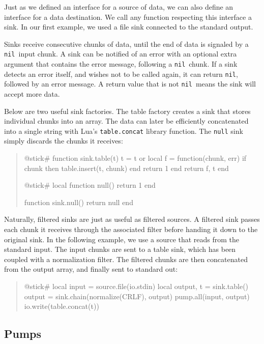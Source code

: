 \documentclass[10pt]{article}
\newcommand{\nil}{\texttt{nil}}
\begin{document}
Just as we defined an interface for a source of data, we can
also define an interface for a data destination.  We call
any function respecting this interface a sink. In our first
example, we used a file sink connected to the standard
output. 

Sinks receive consecutive chunks of data, until the end of
data is signaled by a \nil\ input chunk. A sink can be
notified of an error with an optional extra argument that
contains the error message, following a \nil\ chunk.  
If a sink detects an error itself, and
wishes not to be called again, it can return \nil,
followed by an error message. A return value that
is not \nil\ means the sink will accept more data.

Below are two useful sink factories. 
The table factory creates a sink that stores
individual chunks into an array. The data can later be
efficiently concatenated into a single string with Lua's
\texttt{table.concat} library function. The \texttt{null} sink 
simply discards the chunks it receives:
\begin{quote}
\begin{lua}
@stick#
function sink.table(t)
  t = t or {}
  local f = function(chunk, err)
    if chunk then table.insert(t, chunk) end
    return 1
  end
  return f, t
end
%

@stick#
local function null()
  return 1
end

function sink.null()
  return null
end
%
\end{lua}
\end{quote}

Naturally, filtered sinks are just as useful as filtered
sources. A filtered sink passes each chunk it receives
through the associated filter before handing it down to the
original sink.  In the following example, we use a source
that reads from the standard input.  The input chunks are
sent to a table sink, which has been coupled with a
normalization filter.  The filtered chunks are then
concatenated from the output array, and finally sent to
standard out:
\begin{quote}
\begin{lua}
@stick#
local input = source.file(io.stdin)
local output, t = sink.table()
output = sink.chain(normalize(CRLF), output)
pump.all(input, output)
io.write(table.concat(t))
%
\end{lua}
\end{quote}

\subsection{Pumps}
\end{document}
